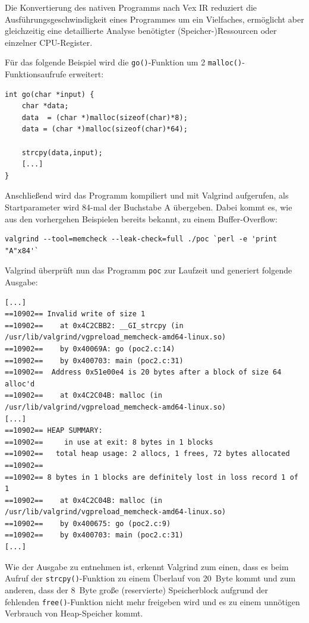 Die Konvertierung des nativen Programms nach Vex IR reduziert die 
Ausführungsgeschwindigkeit eines Programmes um ein Vielfaches, 
ermöglicht aber gleichzeitig eine detaillierte Analyse  benötigter 
(Speicher-)Ressourcen oder einzelner CPU-Register.

Für das folgende Beispiel wird die \texttt{go()}-Funktion um 2 
\texttt{malloc()}-Funktionsaufrufe erweitert:

\begin{lstlisting}[basicstyle=\ttfamily\footnotesize]
int go(char *input) {
    char *data;	
    data  = (char *)malloc(sizeof(char)*8);
    data = (char *)malloc(sizeof(char)*64);

    strcpy(data,input);
    [...]
}
\end{lstlisting}

Anschließend wird das Programm kompiliert und mit Valgrind aufgerufen, 
als Startparameter wird 84-mal der Buchstabe A übergeben. Dabei kommt 
es, wie aus den vorhergehen Beispielen bereits bekannt, zu einem 
Buffer-Overflow:

\begin{lstlisting}[basicstyle=\ttfamily\footnotesize]
valgrind --tool=memcheck --leak-check=full ./poc `perl -e 'print "A"x84'`
\end{lstlisting}

Valgrind überprüft nun das Programm \texttt{poc} zur Laufzeit und 
generiert folgende Ausgabe:

\begin{lstlisting}[basicstyle=\ttfamily\footnotesize]
[...]
==10902== Invalid write of size 1
==10902==    at 0x4C2CBB2: __GI_strcpy (in /usr/lib/valgrind/vgpreload_memcheck-amd64-linux.so)
==10902==    by 0x40069A: go (poc2.c:14)
==10902==    by 0x400703: main (poc2.c:31)
==10902==  Address 0x51e00e4 is 20 bytes after a block of size 64 alloc'd
==10902==    at 0x4C2C04B: malloc (in /usr/lib/valgrind/vgpreload_memcheck-amd64-linux.so)
[...]
==10902== HEAP SUMMARY:
==10902==     in use at exit: 8 bytes in 1 blocks
==10902==   total heap usage: 2 allocs, 1 frees, 72 bytes allocated
==10902==
==10902== 8 bytes in 1 blocks are definitely lost in loss record 1 of 1
==10902==    at 0x4C2C04B: malloc (in /usr/lib/valgrind/vgpreload_memcheck-amd64-linux.so)
==10902==    by 0x400675: go (poc2.c:9)
==10902==    by 0x400703: main (poc2.c:31)
[...]
\end{lstlisting}

Wie der Ausgabe zu entnehmen ist, erkennt Valgrind zum einen, dass es 
beim Aufruf der \texttt{strcpy()}-Funktion zu einem Überlauf von \SI{20}{Byte} 
kommt und zum anderen, dass der \SI{8}{Byte} große (reservierte) 
Speicherblock aufgrund der fehlenden \texttt{free()}-Funktion nicht mehr 
freigeben wird und es zu einem unnötigen Verbrauch von Heap-Speicher kommt.
